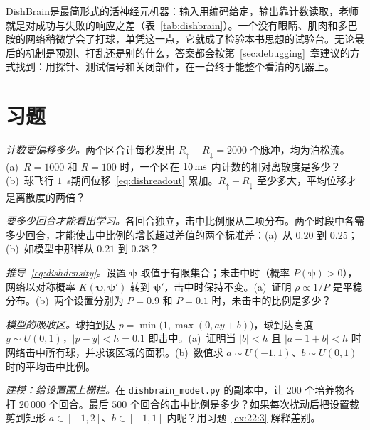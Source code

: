 DishBrain是最简形式的活神经元机器：输入用编码给定，输出靠计数读取，老师就是对成功与失败的响应之差（表~\ref{tab:dishbrain}）。一个没有眼睛、肌肉和多巴胺的网络稍微学会了打球，单凭这一点，它就成了检验本书思想的试验台。无论最后的机制是预测、打乱还是别的什么，答案都会按第~\ref{sec:debugging}~章建议的方式找到：用探针、测试信号和关闭部件，在一台终于能整个看清的机器上。

\section{习题}

\begin{exercise}[\lvlA]
\label{ex:22:1}
\emph{计数要偏移多少。}两个区合计每秒发出 $R_\uparrow+R_\downarrow=2000$ 个脉冲，均为泊松流。(a)~$R=1000$ 和 $R=100$ 时，一个区在 $10\,\text{ms}$ 内计数的相对离散度是多少？(b)~球飞行 $1$~s期间位移~\eqref{eq:dishreadout} 累加。$R_\uparrow-R_\downarrow$ 至少多大，平均位移才是离散度的两倍？
\end{exercise}

\begin{exercise}[\lvlA]
\label{ex:22:2}
\emph{要多少回合才能看出学习。}各回合独立，击中比例服从二项分布。两个时段中各需多少回合，才能使击中比例的增长超过差值的两个标准差：(a)~从 $0.20$ 到 $0.25$；(b)~如模型中那样从 $0.21$ 到 $0.38$？
\end{exercise}

\begin{exercise}[\lvlB]
\label{ex:22:3}
\emph{推导~\eqref{eq:dishdensity}。}设置 $\boldsymbol\psi$ 取值于有限集合；未击中时（概率 $P(\boldsymbol\psi)>0$），网络以对称概率 $K(\boldsymbol\psi,\boldsymbol\psi')$ 转到 $\boldsymbol\psi'$，击中时保持不变。(a)~证明 $\rho\propto1/P$ 是平稳分布。(b)~两个设置分别为 $P=0.9$ 和 $P=0.1$ 时，未击中的比例是多少？
\end{exercise}

\begin{exercise}[\lvlB]
\label{ex:22:4}
\emph{模型的吸收区。}球拍到达 $p=\min\bigl(1,\max(0,ay+b)\bigr)$，球到达高度 $y\sim U(0,1)$，$|p-y|<h=0.1$ 即击中。(a)~证明当 $|b|<h$ 且 $|a-1+b|<h$ 时网络击中所有球，并求该区域的面积。(b)~数值求 $a\sim U(-1,1)$、$b\sim U(0,1)$ 时的平均击中比例。
\end{exercise}

\begin{exercise}[\lvlB]
\label{ex:22:5}
\emph{建模：给设置围上栅栏。}在 \texttt{dishbrain\_model.py} 的副本中，让 $200$ 个培养物各打 $20\,000$ 个回合。最后 $500$ 个回合的击中比例是多少？如果每次扰动后把设置裁剪到矩形 $a\in[-1,2]$、$b\in[-1,1]$ 内呢？用习题~\ref{ex:22:3} 解释差别。
\end{exercise}

